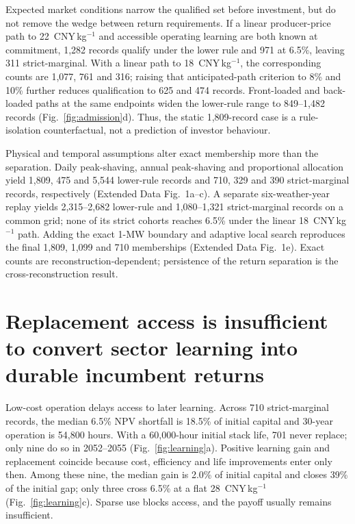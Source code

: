 \documentclass[pdflatex,sn-nature]{sn-jnl}
\newcommand{\cnykg}{CNY\,kg$^{-1}$}
\begin{document}
Expected market conditions narrow the qualified set before investment, but do not remove the wedge between return requirements. If a linear producer-price path to 22~\cnykg{} and accessible operating learning are both known at commitment, 1,282 records qualify under the lower rule and 971 at 6.5\%, leaving 311 strict-marginal. With a linear path to 18~\cnykg{}, the corresponding counts are 1,077, 761 and 316; raising that anticipated-path criterion to 8\% and 10\% further reduces qualification to 625 and 474 records. Front-loaded and back-loaded paths at the same endpoints widen the lower-rule range to 849--1,482 records (Fig.~\ref{fig:admission}d). Thus, the static 1,809-record case is a rule-isolation counterfactual, not a prediction of investor behaviour.

Physical and temporal assumptions alter exact membership more than the separation. Daily peak-shaving, annual peak-shaving and proportional allocation yield 1,809, 475 and 5,544 lower-rule records and 710, 329 and 390 strict-marginal records, respectively (Extended Data Fig.~1a--c). A separate six-weather-year replay yields 2,315--2,682 lower-rule and 1,080--1,321 strict-marginal records on a common grid; none of its strict cohorts reaches 6.5\% under the linear 18~\cnykg{} path. Adding the exact 1-MW boundary and adaptive local search reproduces the final 1,809, 1,099 and 710 memberships (Extended Data Fig.~1e). Exact counts are reconstruction-dependent; persistence of the return separation is the cross-reconstruction result.

\section*{Replacement access is insufficient to convert sector learning into durable incumbent returns}

Low-cost operation delays access to later learning. Across 710 strict-marginal records, the median 6.5\% NPV shortfall is 18.5\% of initial capital and 30-year operation is 54,800 hours. With a 60,000-hour initial stack life, 701 never replace; only nine do so in 2052--2055 (Fig.~\ref{fig:learning}a). Positive learning gain and replacement coincide because cost, efficiency and life improvements enter only then. Among these nine, the median gain is 2.0\% of initial capital and closes 39\% of the initial gap; only three cross 6.5\% at a flat 28~\cnykg{} (Fig.~\ref{fig:learning}c). Sparse use blocks access, and the payoff usually remains insufficient.
\end{document}
